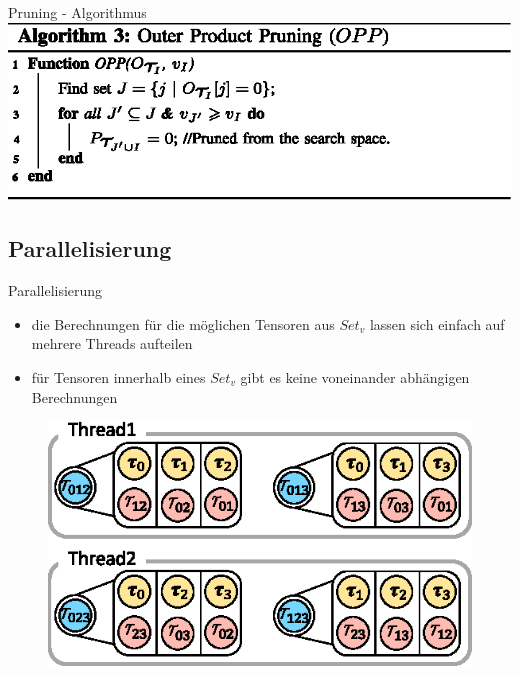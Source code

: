 \documentclass{beamer}
\begin{document}

\begin{frame}{Pruning - Algorithmus}
	\includegraphics[scale=1]{algorithm_03}
\end{frame}
\subsection{Parallelisierung}

\begin{frame}{Parallelisierung}
	\begin{itemize}
		\item die Berechnungen für die möglichen Tensoren aus $Set_v$ lassen sich einfach auf mehrere Threads aufteilen
		\item für Tensoren innerhalb eines $Set_v$ gibt es keine voneinander abhängigen Berechnungen
	\end{itemize}
	\begin{figure}
		\includegraphics{figure_07}
	\end{figure}
\end{frame}
\end{document}
